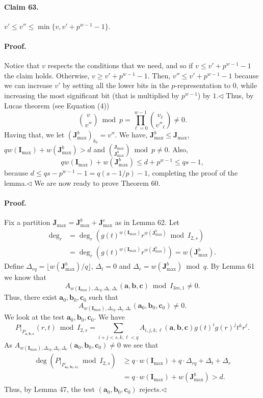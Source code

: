 \paragraph{Claim 63.} $v'\leq v''\leq\min\{v,v'+p^{w-1}-1\}$.
\paragraph{Proof.} Notice that $v$ respects the conditions that we need, and so if $v\leq v'+p^{w-1}-1$ the claim holds. Otherwise, $v\geq v'+p^{w-1}-1$. Then, $v''\leq v'+p^{w-1}-1$ because we can increase $v'$ by setting all the lower bits in the $p$-representation to $0$, while increasing the most significant bit (that is multiplied by $p^{w-1}$) by $1$.\hfill$\triangleleft$
Thus, by Lucas theorem (see Equation (4))
\[\binom v{v''}\bmod p=\prod_{\ell=0}^{w-1}\binom{v_\ell}{v''_\ell}\neq0.\]
Having that, we let $(\boldsymbol J_{\max}^b)_{k_0}=v''$. We have, $\boldsymbol J_{\max}^b\leq\boldsymbol J_{\max}$, $qw(\boldsymbol I_{\max})+w(\boldsymbol J_{\max}^b)>d$ and $\binom{\boldsymbol J_{\max}}{\boldsymbol J_{\max}^b}\bmod p\neq0$. Also,
\[qw(\boldsymbol I_{\max})+w(\boldsymbol J_{\max}^b)\leq d+p^{w-1}\leq qs-1,\]
because $d\leq qs-p^{w-1}-1=q(s-1/p)-1$, completing the proof of the lemma.\hfill$\triangleleft$
We are now ready to prove Theorem 60.
\paragraph{Proof.} Fix a partition $\boldsymbol J_{\max}=\boldsymbol J_{\max}^b+\boldsymbol J_{\max}^c$ as in Lemma 62. Let
\begin{align*}
\deg_r&=\deg_r(g(t)^{w(\boldsymbol I_{\max})}r^{w(\boldsymbol J_{\max}^b)}\bmod I_{2,s})\\
&=\deg_r(g(t)^{w(\boldsymbol I_{\max})}r^{w(\boldsymbol J_{\max}^b)})=w(\boldsymbol J_{\max}^b).
\end{align*}
Define $\Delta_{rq}=\lfloor w(\boldsymbol J_{\max}^b)/q\rfloor$, $\Delta_t=0$ and $\Delta_r=w(\boldsymbol J_{\max}^b)\bmod q$. By Lemma 61 we know that
\[A_{w(\boldsymbol I_{\max}),\Delta_{rq},\Delta_t,\Delta_r}(\boldsymbol a,\boldsymbol b,\boldsymbol c)\bmod I_{3m,1}\neq0.\]
Thus, there exist $\boldsymbol a_0,\boldsymbol b_0,\boldsymbol c_0$ such that
\[A_{w(\boldsymbol I_{\max}),\Delta_{rq},\Delta_t,\Delta_r}(\boldsymbol a_0,\boldsymbol b_0,\boldsymbol c_0)\neq0.\]
We look at the test $\boldsymbol a_0,\boldsymbol b_0,\boldsymbol c_0$. We have
\[P|_{P_{\boldsymbol a,\boldsymbol b,\boldsymbol c}}(r,t)\bmod I_{2,s}=\sum_{i+j<s,k,\ell<q}A_{i,j,k,\ell}(\boldsymbol a,\boldsymbol b,\boldsymbol c)g(t)^ig(r)^jt^kr^\ell.\]
As $A_{w(\boldsymbol I_{\max}),\Delta_{rq},\Delta_t,\Delta_r}(\boldsymbol a_0,\boldsymbol b_0,\boldsymbol c_0)\neq0$ we see that
\begin{align*}
\deg(P|_{P_{\boldsymbol a_0,\boldsymbol b_0,\boldsymbol c_0}}\bmod I_{2,s})
&\geq q\cdot w(\boldsymbol I_{\max})+q\cdot\Delta_{rq}+\Delta_t+\Delta_r\\
&=q\cdot w(\boldsymbol I_{\max})+w(\boldsymbol J_{\max}^b)>d.
\end{align*}
Thus, by Lemma 47, the test $(\boldsymbol a_0,\boldsymbol b_0,\boldsymbol c_0)$ rejects.\hfill$\triangleleft$
